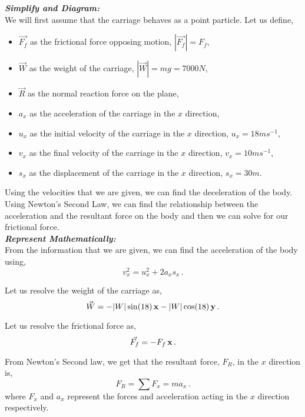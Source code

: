 \begin{subquestions}
\textbf{\textit{Simplify and Diagram:}} \\
We will first assume that the carriage behaves as a point particle. Let us define,
\begin{itemize}
	\item $\vec{F_f}$ as the frictional force opposing motion, $|\vec{F_f}|=F_f$,
	\item $\vec{W}$ as the weight of the carriage, $|\vec{W}|=mg=7000N$,
	\item $\vec{R}$ as the normal reaction force on the plane,
	\item $a_x$ as the acceleration of the carriage in the $x$ direction,
	\item $u_x$ as the initial velocity of the carriage in the $x$ direction, $u_x=18ms^{-1}$,
	\item $v_x$ as the final velocity of the carriage in the $x$ direction, $v_x=10ms^{-1}$,
	\item $s_x$ as the displacement of the carriage in the $x$ direction, $s_x=30m$.
\end{itemize}
Using the velocities that we  are given, we can find the deceleration of the body. Using Newton's Second Law, we can find the relationship between the acceleration and the resultant force on the body and then we can solve for our frictional force.\\




\textbf{\textit{Represent Mathematically:}} \\
From the information that we are given, we can find the acceleration of the body using,
\begin{equation}
	v_x^2 = u_x^2 + 2a_xs_x \,. \label{2013:q5:AEqn1} 
\end{equation}

Let us resolve the weight of the carriage as,
\begin{equation}
	\vec{W} = -|W|\sin(18)\,\mathbf{x}-|W|\cos(18)\,\mathbf{y} \,.
\end{equation}

Let us resolve the frictional force as,
\begin{equation}
	\vec{F_f} = -F_f \,\mathbf{x} \,.
\end{equation}

From Newton's Second law, we get that the resultant force, $F_R$, in the $x$ direction is,
\begin{equation}
	F_R = \sum F_x  = ma_x \,.	\label{2013:q5:Newton1}
\end{equation}
where $F_x$ and $a_x$ represent the forces and acceleration acting in the $x$ direction respectively.\\





\end{subquestions}
